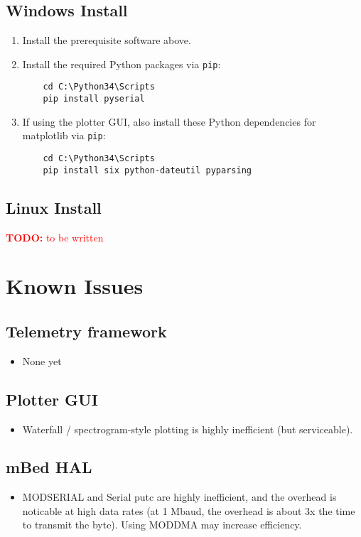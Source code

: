 \documentclass[11pt]{article}
\newcommand{\todo}[1]{\textcolor{red}{\textbf{TODO:} #1}}
\begin{document}
\subsection{Windows Install}
\begin{enumerate}
  \item Install the prerequisite software above.
  \item Install the required Python packages via \texttt{pip}:
  \begin{verbatim}
    cd C:\Python34\Scripts
    pip install pyserial 
  \end{verbatim}
  \item If using the plotter GUI, also install these Python dependencies for matplotlib via \texttt{pip}:
  \begin{verbatim}
    cd C:\Python34\Scripts
    pip install six python-dateutil pyparsing
  \end{verbatim}
\end{enumerate}

\subsection{Linux Install}
\todo{to be written}

\section{Known Issues}
\subsection{Telemetry framework}
\begin{itemize}
  \item None yet
\end{itemize}

\subsection{Plotter GUI}
\begin{itemize}
  \item Waterfall / spectrogram-style plotting is highly inefficient (but serviceable).
\end{itemize}

\subsection{mBed HAL}
\begin{itemize}
  \item MODSERIAL and Serial putc are highly inefficient, and the overhead is noticable at high data rates (at 1 Mbaud, the overhead is about 3x the time to transmit the byte). Using MODDMA may increase efficiency.
\end{itemize}
\end{document}
